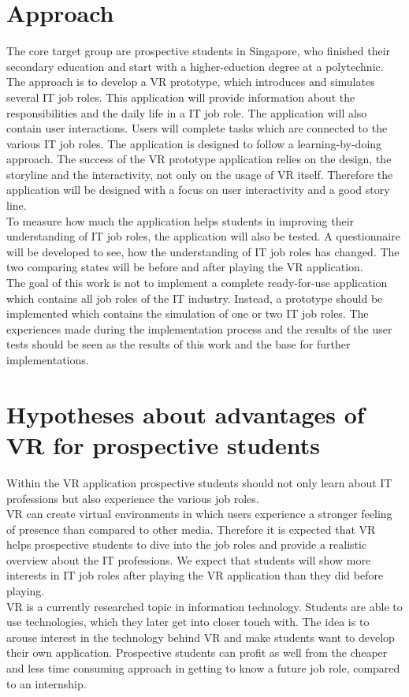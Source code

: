 \section{Approach}
The core target group are prospective students in Singapore, who finished their secondary education and start with a higher-eduction degree at a polytechnic.\\
The approach is to develop a VR prototype, which introduces and simulates several IT job roles. This application will provide information about the responsibilities and the daily life in a IT job role. The application will also contain user interactions. Users will complete tasks which are connected to the various IT job roles. The application is designed to follow a learning-by-doing approach. The success of the VR prototype application relies on the design, the storyline and the interactivity, not only on the usage of VR itself. Therefore the application will be designed with a focus on user interactivity and a good story line.\\
To measure how much the application helps students in improving their understanding of IT job roles, the application will also be tested. A questionnaire will be developed to see, how the understanding of IT job roles has changed. The two comparing states will be before and after playing the VR application.\\
The goal of this work is not to implement a complete ready-for-use application which contains all job roles of the IT industry. Instead, a prototype should be implemented which contains the simulation of one or two IT job roles. The experiences made during the implementation process and the results of the user tests should be seen as the results of this work and the base for further implementations.

\section{Hypotheses about advantages of VR for prospective students}
Within the VR application prospective students should not only learn about IT professions but also experience the various job roles.\\
VR can create virtual environments in which users experience a stronger feeling of presence than compared to other media. Therefore it is expected that VR helps prospective students to dive into the job roles and provide a realistic overview about the IT professions. We expect that students will show more interests in IT job roles after playing the VR application than they did before playing. \\
VR is a currently researched topic in information technology. Students are able to use technologies, which they later get into closer touch with. The idea is to arouse interest in the technology behind VR and make students want to develop their own application. Prospective students can profit as well from the cheaper and less time consuming approach in getting to know a future job role, compared to an internship. 

